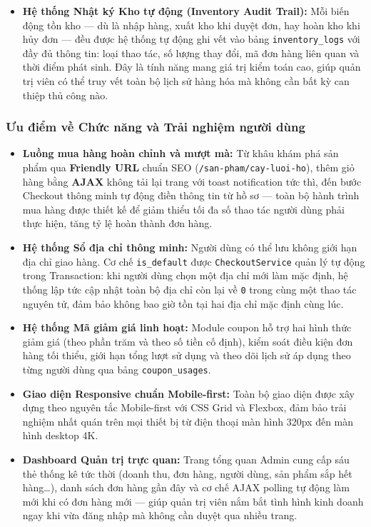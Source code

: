 \documentclass[11pt, a4paper]{article}
\begin{document}
\begin{itemize}[leftmargin=*]
    \item \textbf{Hệ thống Nhật ký Kho tự động (Inventory Audit Trail):}
    Mỗi biến động tồn kho --- dù là nhập hàng, xuất kho khi duyệt đơn, hay
    hoàn kho khi hủy đơn --- đều được hệ thống tự động ghi vết vào bảng
    \texttt{inventory\_logs} với đầy đủ thông tin: loại thao tác, số lượng
    thay đổi, mã đơn hàng liên quan và thời điểm phát sinh. Đây là tính năng
    mang giá trị kiểm toán cao, giúp quản trị viên có thể truy vết toàn bộ
    lịch sử hàng hóa mà không cần bất kỳ can thiệp thủ công nào.
\end{itemize}

\subsubsection{Ưu điểm về Chức năng và Trải nghiệm người dùng}

\begin{itemize}[leftmargin=*]
    \item \textbf{Luồng mua hàng hoàn chỉnh và mượt mà:}
    Từ khâu khám phá sản phẩm qua \textbf{Friendly URL} chuẩn SEO
    (\texttt{/san-pham/cay-luoi-ho}), thêm giỏ hàng bằng \textbf{AJAX}
    không tải lại trang với toast notification tức thì, đến bước Checkout
    thông minh tự động điền thông tin từ hồ sơ --- toàn bộ hành trình mua
    hàng được thiết kế để giảm thiểu tối đa số thao tác người dùng phải thực
    hiện, tăng tỷ lệ hoàn thành đơn hàng.

    \item \textbf{Hệ thống Sổ địa chỉ thông minh:}
    Người dùng có thể lưu không giới hạn địa chỉ giao hàng. Cơ chế
    \texttt{is\_default} được \texttt{CheckoutService} quản lý tự động trong
    Transaction: khi người dùng chọn một địa chỉ mới làm mặc định, hệ thống
    lập tức cập nhật toàn bộ địa chỉ còn lại về \texttt{0} trong cùng một
    thao tác nguyên tử, đảm bảo không bao giờ tồn tại hai địa chỉ mặc định
    cùng lúc.

    \item \textbf{Hệ thống Mã giảm giá linh hoạt:}
    Module coupon hỗ trợ hai hình thức giảm giá (theo phần trăm và theo số
    tiền cố định), kiểm soát điều kiện đơn hàng tối thiểu, giới hạn tổng
    lượt sử dụng và theo dõi lịch sử áp dụng theo từng người dùng qua bảng
    \texttt{coupon\_usages}.

    \item \textbf{Giao diện Responsive chuẩn Mobile-first:}
    Toàn bộ giao diện được xây dựng theo nguyên tắc Mobile-first với CSS Grid
    và Flexbox, đảm bảo trải nghiệm nhất quán trên mọi thiết bị từ điện thoại
    màn hình 320px đến màn hình desktop 4K.

    \item \textbf{Dashboard Quản trị trực quan:}
    Trang tổng quan Admin cung cấp sáu thẻ thống kê tức thời (doanh thu,
    đơn hàng, người dùng, sản phẩm sắp hết hàng\ldots), danh sách đơn hàng
    gần đây và cơ chế AJAX polling tự động làm mới khi có đơn hàng mới
    --- giúp quản trị viên nắm bắt tình hình kinh doanh ngay khi vừa đăng
    nhập mà không cần duyệt qua nhiều trang.
\end{itemize}
\end{document}
